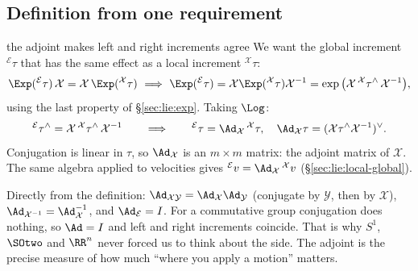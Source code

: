 \subsection{Definition from one requirement}\label{sec:lie:adjoint-definition}

\begin{deriv}{the adjoint makes left and right increments agree}
We want the global increment ${}^{\mathcal E}\tau$ that has the same effect as a local increment ${}^{\mathcal X}\tau$:
\[
\Exp({}^{\mathcal E}\tau)\,\mathcal X=\mathcal X\,\Exp({}^{\mathcal X}\tau)
\ \Longrightarrow\
\Exp({}^{\mathcal E}\tau)=\mathcal X\Exp({}^{\mathcal X}\tau)\mathcal X^{-1}=\exp\big(\mathcal X\,{}^{\mathcal X}\tau^\wedge\,\mathcal X^{-1}\big),
\]
using the last property of \S\ref{sec:lie:exp}. Taking $\Log$:
\[
{}^{\mathcal E}\tau^\wedge=\mathcal X\,{}^{\mathcal X}\tau^\wedge\,\mathcal X^{-1}\qquad\Longrightarrow\qquad {}^{\mathcal E}\tau=\Ad_{\mathcal X}\,{}^{\mathcal X}\tau,\quad \Ad_{\mathcal X}\tau=(\mathcal X\tau^\wedge\mathcal X^{-1})^\vee .
\]
Conjugation is linear in $\tau$, so $\Ad_{\mathcal X}$ is an $m\times m$ matrix: the adjoint matrix of $\mathcal X$. The same algebra applied to velocities gives ${}^{\mathcal E}v=\Ad_{\mathcal X}\,{}^{\mathcal X}v$ (\S\ref{sec:lie:local-global}).
\end{deriv}

Directly from the definition: $\Ad_{\mathcal X\mathcal Y}=\Ad_{\mathcal X}\Ad_{\mathcal Y}$ (conjugate by $\mathcal Y$, then by $\mathcal X$), $\Ad_{\mathcal X^{-1}}=\Ad_{\mathcal X}^{-1}$, and $\Ad_{\mathcal E}=I$. For a commutative group conjugation does nothing, so $\Ad=I$ and left and right increments coincide. That is why $S^1$, $\SOtwo$ and $\RR^n$ never forced us to think about the side. The adjoint is the precise measure of how much ``where you apply a motion'' matters.
